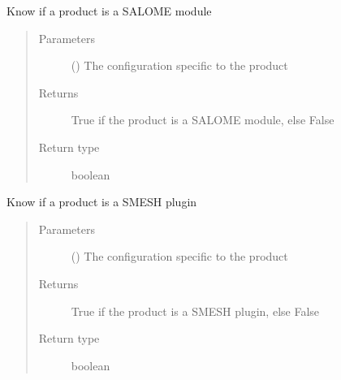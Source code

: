 \documentclass[a4paper,10pt,english]{sphinxmanual}
\begin{document}

\begin{fulllineitems}
\label{\detokenize{commands/apidoc/src:src.product.product_is_salome}}
Know if a product is a SALOME module
\begin{quote}\begin{description}
\item[{Parameters}] \leavevmode
{} () \textendash{} The configuration specific to 
the product

\item[{Returns}] \leavevmode
True if the product is a SALOME module, else False

\item[{Return type}] \leavevmode
boolean

\end{description}\end{quote}

\end{fulllineitems}


\begin{fulllineitems}
\label{\detokenize{commands/apidoc/src:src.product.product_is_smesh_plugin}}
Know if a product is a SMESH plugin
\begin{quote}\begin{description}
\item[{Parameters}] \leavevmode
{} () \textendash{} The configuration specific to 
the product

\item[{Returns}] \leavevmode
True if the product is a SMESH plugin, else False

\item[{Return type}] \leavevmode
boolean

\end{description}\end{quote}

\end{fulllineitems}
\end{document}
